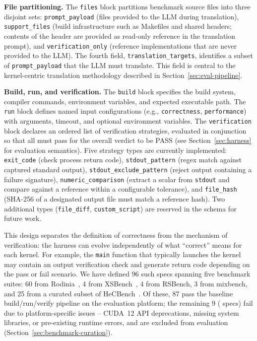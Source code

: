 \textbf{File partitioning.} The \texttt{files} block partitions benchmark source files into three disjoint sets: \texttt{prompt\_payload} (files provided to the LLM during translation), \texttt{support\_files} (build infrastructure such as Makefiles and shared headers; contents of the header are provided as read-only reference in the translation prompt), and \texttt{verification\_only} (reference implementations that are never provided to the LLM). The fourth field, \texttt{translation\_targets}, identifies a subset of \texttt{prompt\_payload} that the LLM must translate. This field is central to the kernel-centric translation methodology described in Section~\ref{sec:eval-pipeline}.

\textbf{Build, run, and verification.} The \texttt{build} block specifies the build system, compiler commands, environment variables, and expected executable path. The \texttt{run} block defines named input configurations (e.g., \texttt{correctness}, \texttt{performance}) with arguments, timeout, and optional environment variables. The \texttt{verification} block declares an ordered list of verification strategies, evaluated in conjunction so that all must pass for the overall verdict to be PASS (see Section~\ref{sec:harness} for evaluation semantics). Five strategy types are currently implemented: \texttt{exit\_code} (check process return code), \texttt{stdout\_pattern} (regex match against captured standard output), \texttt{stdout\_exclude\_pattern} (reject output containing a failure signature), \texttt{numeric\_comparison} (extract a scalar from \texttt{stdout} and compare against a reference within a configurable tolerance), and \texttt{file\_hash} (SHA-256 of a designated output file must match a reference hash). Two additional types (\texttt{file\_diff}, \texttt{custom\_script}) are reserved in the schema for future work.

This design separates the definition of correctness from the mechanism of verification: the harness can evolve independently of what ``correct'' means for each kernel. For example, the \texttt{main} function that typically launches the kernel may contain an output verification check and generate return code depending on the pass or fail scenario. We have defined 96 such specs spanning five benchmark suites: 60 from Rodinia~\cite{Rodinia2009}, 4 from XSBench~\cite{XSBench2014}, 4 from RSBench, 3 from mixbench, and 25 from a curated subset of HeCBench~\cite{HeCBench2023}. Of these, 87 pass the baseline build/run/verify pipeline on the evaluation platform; the remaining 9 (\knownfail{} specs) fail due to platform-specific issues -- CUDA~12 API deprecations, missing system libraries, or pre-existing runtime errors, and are excluded from evaluation (Section~\ref{sec:benchmark-curation}).

